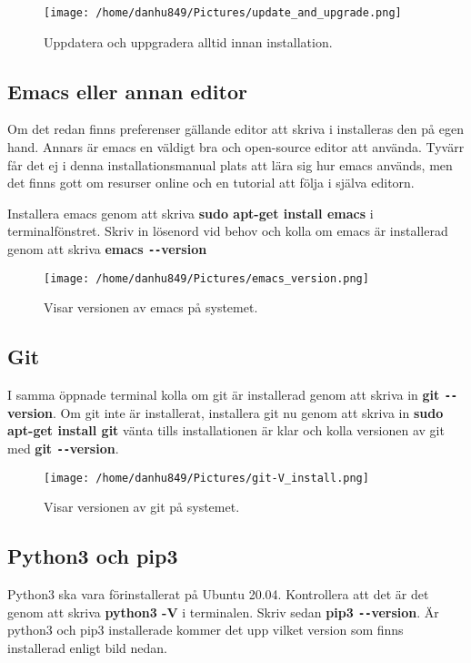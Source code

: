 \documentclass{TDP003mall}
\begin{document}
\begin{figure}[h]
  \centerline{\texttt{[image: /home/danhu849/Pictures/update\_and\_upgrade.png]}}
  \caption{Uppdatera och uppgradera alltid innan installation.}
  \label{fig}
\end{figure}

\subsection{Emacs eller annan editor}
Om det redan finns preferenser gällande editor att skriva i installeras den på egen hand. Annars är emacs en väldigt bra och open-source editor att använda. Tyvärr får det ej i denna installationsmanual plats att lära sig hur emacs används, men det finns gott om resurser online och en tutorial att följa i själva editorn.

Installera emacs genom att skriva \textbf{sudo apt-get install emacs} i terminalfönstret. Skriv in lösenord vid behov och kolla om emacs är installerad genom att skriva \textbf{emacs \texttt{-{}-}version}
\begin{figure}[h]
  \centerline{\texttt{[image: /home/danhu849/Pictures/emacs\_version.png]}}
  \caption{Visar versionen av emacs på systemet.}
  \label{fig}
\end{figure}

\subsection{Git}
I samma öppnade terminal kolla om git är installerad genom att skriva in \textbf{git \texttt{-{}-}version}. Om git inte är installerat, installera git nu genom att skriva in \textbf{sudo apt-get install git} vänta tills installationen är klar och kolla versionen av git med \textbf{git \texttt{-{}-}version}.

\begin{figure}[h]
  \centerline{\texttt{[image: /home/danhu849/Pictures/git-V\_install.png]}}
  \caption{Visar versionen av git på systemet.}
  \label{fig}
\end{figure}

\subsection{Python3 och pip3}
Python3 ska vara förinstallerat på Ubuntu 20.04. Kontrollera att det är det genom att skriva \textbf{python3 -V} i terminalen. Skriv sedan \textbf{pip3 \texttt{-{}-}version}. Är python3 och pip3 installerade kommer det upp vilket version som finns installerad enligt bild nedan.
\end{document}
